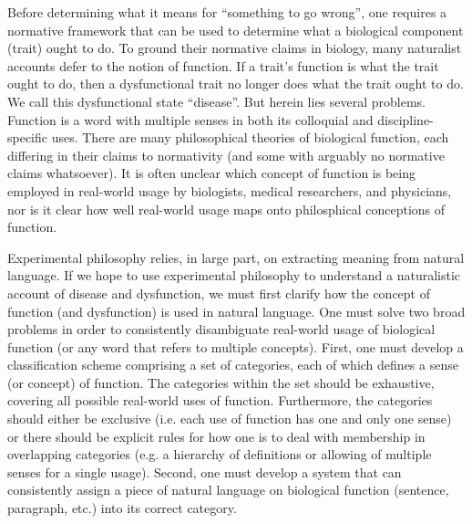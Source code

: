 \documentclass{article}
\begin{document}
Before determining what it means for ``something to go wrong'', one requires a normative framework that can be used to determine what a biological component (trait) ought to do.
To ground their normative claims in biology, many naturalist accounts defer to the notion of function.
If a trait's function is what the trait ought to do, then a dysfunctional trait no longer does what the trait ought to do.
We call this dysfunctional state ``disease''.
But herein lies several problems.
Function is a word with multiple senses in both its colloquial and discipline-specific uses.
There are many philosophical theories of biological function, each differing in their claims to normativity (and some with arguably no normative claims whatsoever).
It is often unclear which concept of function is being employed in real-world usage by biologists, medical researchers, and physicians, nor is it clear how well real-world usage maps onto philosphical conceptions of function.

Experimental philosophy relies, in large part, on extracting meaning from natural language.
If we hope to use experimental philosophy to understand a naturalistic account of disease and dysfunction, we must first clarify how the concept of function (and dysfunction) is used in natural language.
One must solve two broad problems in order to consistently disambiguate real-world usage of biological function (or any word that refers to multiple concepts).
First, one must develop a classification scheme comprising a set of categories, each of which defines a sense (or concept) of function.
The categories within the set should be exhaustive, covering all possible real-world uses of function.
Furthermore, the categories should either be exclusive (i.e. each use of function has one and only one sense) or there should be explicit rules for how one is to deal with membership in overlapping categories (e.g. a hierarchy of definitions or allowing of multiple senses for a single usage). 
Second, one must develop a system that can consistently assign a piece of natural language on biological function (sentence, paragraph, etc.) into its correct category.
\end{document}
